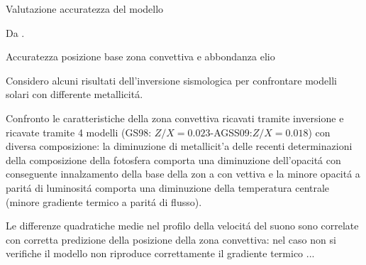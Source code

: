 \documentclass[10pt,xcolor={usenames},fleqn,mathserif,serif]{beamer}
\begin{document}
\begin{frame}{Valutazione accuratezza del modello}

\begin{table}[!ht]%

     \caption{Da \cite{basu2016global}.}
\label{tab:CZZvar}
\end{table}

\end{frame}

\begin{wordonframe}{Accuratezza posizione base zona convettiva e abbondanza elio}

Considero alcuni risultati dell'inversione sismologica per confrontare modelli solari con differente metallicit\'a.

Confronto le caratteristiche della zona convettiva ricavati tramite inversione e  ricavate tramite 4 modelli (GS98: $Z/X=0.023$-AGSS09:$Z/X=0.018$) con diversa composizione: la diminuzione di metallicit'a delle recenti determinazioni della composizione della fotosfera comporta una diminuzione dell'opacit\'a con conseguente innalzamento della base della zon a con vettiva e la minore opacit\'a a parit\'a di luminosit\'a comporta una diminuzione della temperatura centrale (minore gradiente termico a parit\'a di flusso).

Le differenze quadratiche medie nel profilo della velocit\'a del suono sono  correlate con corretta predizione della posizione della zona convettiva: nel caso non si verifiche il modello non riproduce correttamente il gradiente termico ...

\end{wordonframe}
\end{document}
